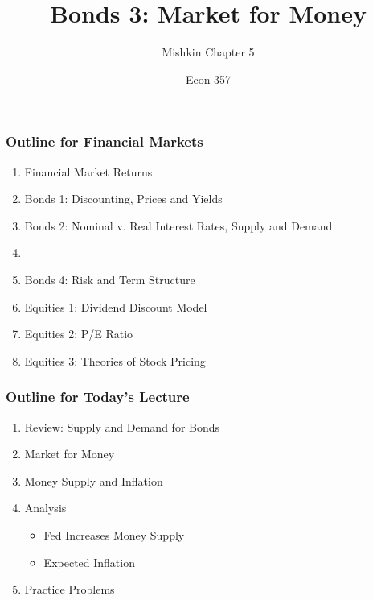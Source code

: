 \documentclass{beamer}
\title{Bonds 3: Market for Money}
\subtitle{Mishkin Chapter 5}
\author{Econ 357}
\date{\week}
\begin{document}
\frame{\titlepage}

\begin{frame}
    \frametitle{Outline for Financial Markets}
        \begin{enumerate}
            \item Financial Market Returns
            \item Bonds 1: Discounting, Prices and Yields
            \item Bonds 2: Nominal v. Real Interest Rates, Supply and Demand
            \item {}
            \item Bonds 4: Risk and Term Structure
            \item Equities 1: Dividend Discount Model
            \item Equities 2: P/E Ratio
            \item Equities 3: Theories of Stock Pricing
            
        \end{enumerate}
\end{frame}


\begin{frame}
    \frametitle{Outline for Today's Lecture}
    \begin{enumerate}
        \item Review: Supply and Demand for Bonds
        \item Market for Money
        \item Money Supply and Inflation
        \item Analysis
        \begin{itemize}
            \item Fed Increases Money Supply
            \item Expected Inflation
        \end{itemize}
        \item Practice Problems
    \end{enumerate}

\end{frame}
\end{document}
